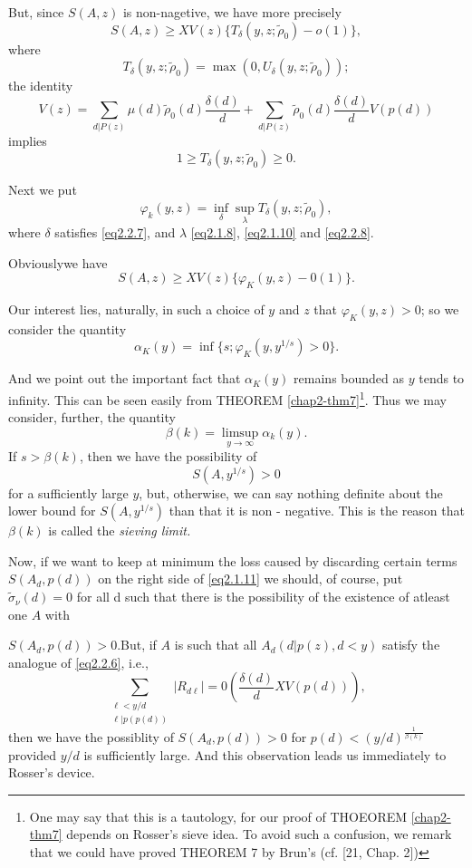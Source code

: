 But, since $S(A,z)$ is non-nagetive, we have more precisely
$$
 S(A,z) \ge XV(z) \{ T_\delta(y,z; \tilde{\rho}_0)- o (1)\},
$$
where
$$
T_\delta(y,z; \tilde{\rho}_0) =  \max (0, U_\delta(y,z; \tilde{\rho}_0));
$$
the identity 
$$
    V(z)= \sum_{d|P(z)} \mu(d) \tilde{\rho}_0(d) \frac{\delta(d)}{d} +
    \sum_{d|P(z)} \tilde{\rho}_0(d) \frac{\delta(d)}{d} V(p(d)) 
$$
implies
$$
  1 \ge T_\delta(y,z; \tilde{\rho}_0) \ge 0.
$$
    
Next we put
$$
 \varphi_k(y,z)= \inf_{\delta} \sup_{\lambda} T_\delta(y,z; \tilde{\rho}_0),
$$
where $\delta$ satisfies \eqref{eq2.2.7}, and $\lambda$
\eqref{eq2.1.8}, \eqref{eq2.1.10} and \eqref{eq2.2.8}. 

Obviously\pageoriginale we have
$$
S(A,z) \ge XV (z) \{ \varphi_K (y,z) - 0(1)\}.
$$

Our interest lies, naturally, in such a choice of $y$ and $z$ that
$\varphi_K (y,z) > 0$; so we consider the quantity 
$$
\alpha_K (y) = \inf \{ s; \varphi_K (y,y^{1/s}) > 0\}.
$$

And we point out the important fact that $\alpha_K(y)$ remains bounded
as $y$ tends to infinity. This can be seen easily from THEOREM
\ref{chap2-thm7}\footnote[1]{One may say that this is a tautology, for
  our proof of 
   THOEOREM \ref{chap2-thm7} depends on Rosser's sieve idea. To avoid such a
  confusion, we remark that we could have proved THEOREM 7 by Brun's
  (cf. [21, Chap. 2])}. Thus we may consider, further, the quantity  
$$
\beta(k) = \limsup_{y \rightarrow \infty} \alpha_k(y).
$$
If $s > \beta (k)$, then we have the possibility of 
$$
S(A, y^{1/s}) > 0
$$
for a sufficiently large $y$, but, otherwise, we can say nothing
definite about the lower bound for $S(A, y^{1/s}) $ than that it is
non - negative. This is the reason that $\beta(k)$ is called the
\textit{sieving limit.} 

Now, if we want to keep at minimum the loss caused by discarding
certain terms $S(A_d, p (d))$ on the right side of \eqref{eq2.1.11} we should,
of course, put $\tilde{\sigma}_\nu (d) = 0$ for all d such that there
is the possibility of the existence of atleast one $A$ with 

$S(A_d, p(d)) > 0$.\pageoriginale But, if $A$ is such that all $A_d (d|p(z),d < y)$
satisfy the analogue of \eqref{eq2.2.6}, i.e., 
$$
\sum_{\substack {\ell < y / d \\ \ell | p(p(d))}} |R_{d \ell}| =
0 (\frac{\delta(d)}{d} XV(p(d))),  
$$
then we have the possiblity of $S(A_d, p(d)) > 0$ for $p(d) <
(y/d)^{\frac{1}{\beta(k)}}$ provided $y/d$ is sufficiently large. And
this observation leads us immediately to Rosser's device. 

